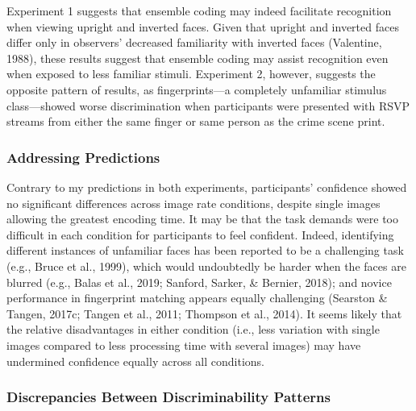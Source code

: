 \documentclass[
  english,
  man]{apa6}
\begin{document}
Experiment 1 suggests that ensemble coding may indeed facilitate recognition when viewing upright and inverted faces. Given that upright and inverted faces differ only in observers' decreased familiarity with inverted faces (Valentine, 1988), these results suggest that ensemble coding may assist recognition even when exposed to less familiar stimuli. Experiment 2, however, suggests the opposite pattern of results, as fingerprints---a completely unfamiliar stimulus class---showed worse discrimination when participants were presented with RSVP streams from either the same finger or same person as the crime scene print.

\hypertarget{addressing-predictions-2}{%
\subsubsection{Addressing Predictions}\label{addressing-predictions-2}}

Contrary to my predictions in both experiments, participants' confidence showed no significant differences across image rate conditions, despite single images allowing the greatest encoding time. It may be that the task demands were too difficult in each condition for participants to feel confident. Indeed, identifying different instances of unfamiliar faces has been reported to be a challenging task (e.g., Bruce et al., 1999), which would undoubtedly be harder when the faces are blurred (e.g., Balas et al., 2019; Sanford, Sarker, \& Bernier, 2018); and novice performance in fingerprint matching appears equally challenging (Searston \& Tangen, 2017c; Tangen et al., 2011; Thompson et al., 2014). It seems likely that the relative disadvantages in either condition (i.e., less variation with single images compared to less processing time with several images) may have undermined confidence equally across all conditions.

\hypertarget{discrepancies-between-discriminability-patterns}{%
\subsubsection{Discrepancies Between Discriminability Patterns}\label{discrepancies-between-discriminability-patterns}}
\end{document}
